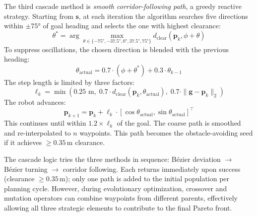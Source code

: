 \documentclass[lettersize,journal]{IEEEtran}
\begin{document}
The third cascade method is \textit{smooth corridor-following path}, a greedy 
reactive strategy. Starting from $\mathbf{s}$, at each iteration the algorithm 
searches five directions within $\pm 75°$ of goal heading and selects the one 
with highest clearance:
\begin{equation}
  \theta^* = \arg\max_{\theta \in \{-75°, -37.5°, 0°, 37.5°, 75°\}}
             d_{\mathrm{clear}}(\mathbf{p}_k, \phi + \theta)
  \label{eq:corridor_search}
\end{equation}
To suppress oscillations, the chosen direction is blended with the previous 
heading:
\begin{equation}
  \theta_{\mathrm{actual}} = 0.7 \cdot (\phi + \theta^*) + 0.3 \cdot \theta_{k-1}
  \label{eq:corridor_smoothing}
\end{equation}
The step length is limited by three factors:
\begin{equation}
  \ell_k = \min\!\left(0.25\text{ m},\;
                      0.7 \cdot d_{\mathrm{clear}}(\mathbf{p}_k, \theta_{\mathrm{actual}}),\;
                      0.7 \cdot \|\mathbf{g} - \mathbf{p}_k\|_2\right)
  \label{eq:corridor_step}
\end{equation}
The robot advances:
\begin{equation}
  \mathbf{p}_{k+1} = \mathbf{p}_k + \ell_k \cdot
                    [\cos\theta_{\mathrm{actual}}, \sin\theta_{\mathrm{actual}}]^\top
  \label{eq:corridor_advance}
\end{equation}
This continues until within $1.2 \times \ell_k$ of the goal. The coarse path 
is smoothed and re-interpolated to $n$ waypoints. This path becomes the 
obstacle-avoiding seed if it achieves $\geq 0.35$\,m clearance.

The cascade logic tries the three methods in sequence: Bézier deviation 
$\to$ Bézier turning $\to$ corridor following. Each returns immediately upon 
success (clearance $\geq 0.35$\,m); only one path is added to the initial 
population per planning cycle. However, during evolutionary optimization, 
crossover and mutation operators can combine waypoints from different parents, 
effectively allowing all three strategic elements to contribute to the final 
Pareto front.
\end{document}
